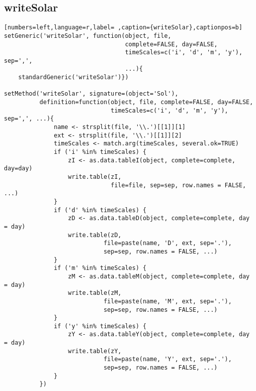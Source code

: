 \subsection{writeSolar}
\label{sec:orga043359}
\label{subsec:writesolar}
\begin{lstlisting}[numbers=left,language=r,label= ,caption={writeSolar},captionpos=b]
setGeneric('writeSolar', function(object, file,
                                  complete=FALSE, day=FALSE,
                                  timeScales=c('i', 'd', 'm', 'y'), sep=',',
                                  ...){
    standardGeneric('writeSolar')})

setMethod('writeSolar', signature=(object='Sol'),
          definition=function(object, file, complete=FALSE, day=FALSE,
                              timeScales=c('i', 'd', 'm', 'y'), sep=',', ...){
              name <- strsplit(file, '\\.')[[1]][1]
              ext <- strsplit(file, '\\.')[[1]][2]
              timeScales <- match.arg(timeScales, several.ok=TRUE)
              if ('i' %in% timeScales) {
                  zI <- as.data.tableI(object, complete=complete, day=day)
                  write.table(zI,
                              file=file, sep=sep, row.names = FALSE, ...)
              }
              if ('d' %in% timeScales) {
                  zD <- as.data.tableD(object, complete=complete, day = day)
                  write.table(zD,
                            file=paste(name, 'D', ext, sep='.'),
                            sep=sep, row.names = FALSE, ...)
              }
              if ('m' %in% timeScales) {
                  zM <- as.data.tableM(object, complete=complete, day = day)
                  write.table(zM,
                            file=paste(name, 'M', ext, sep='.'),
                            sep=sep, row.names = FALSE, ...)
              }
              if ('y' %in% timeScales) {
                  zY <- as.data.tableY(object, complete=complete, day = day)
                  write.table(zY,
                            file=paste(name, 'Y', ext, sep='.'),
                            sep=sep, row.names = FALSE, ...)
              }
          })
\end{lstlisting}
